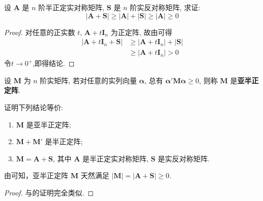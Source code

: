 \documentclass[../../main.tex]{subfiles}
\begin{document}
\begin{proposition}\label{proposition:半正定阵的行列式的相关的不等式}
设 \(\boldsymbol{A}\) 是 \(n\) 阶半正定实对称矩阵, \(\boldsymbol{S}\) 是 \(n\) 阶实反对称矩阵, 求证:
\[|\boldsymbol{A}+\boldsymbol{S}|\geq|\boldsymbol{A}|+|\boldsymbol{S}|\geq|\boldsymbol{A}|\geq0\]
\end{proposition}
\begin{proof}
对任意的正实数 \(t\), \(\boldsymbol{A}+t\boldsymbol{I}_n\) 为正定阵, 故由可得
\begin{align*}
|\boldsymbol{A}+t\boldsymbol{I}_n+\boldsymbol{S}|&\geq|\boldsymbol{A}+t\boldsymbol{I}_n|+|\boldsymbol{S}|\\
&\geq|\boldsymbol{A}+t\boldsymbol{I}_n|>0
\end{align*}
令\(t\to0^+\),即得结论.
\end{proof}

\begin{definition}[亚半正定]
设 \(\boldsymbol{M}\) 为 \(n\) 阶实矩阵, 若对任意的实列向量 \(\boldsymbol{\alpha}\), 总有 \(\boldsymbol{\alpha}'\boldsymbol{M}\boldsymbol{\alpha}\geq0\), 则称 \(\boldsymbol{M}\) 是\textbf{亚半正定阵}. 
\end{definition}

\begin{theorem}\label{theorem:亚半正定阵的等价条件}
证明下列结论等价:
\begin{enumerate}[(1)]
\item \(\boldsymbol{M}\) 是亚半正定阵;
\item \(\boldsymbol{M}+\boldsymbol{M}'\) 是半正定阵;
\item \(\boldsymbol{M}=\boldsymbol{A}+\boldsymbol{S}\), 其中 \(\boldsymbol{A}\) 是半正定实对称矩阵, \(\boldsymbol{S}\) 是实反对称矩阵.
\end{enumerate} 
\end{theorem}
\begin{remark}
由可知，亚半正定阵 \(\boldsymbol{M}\) 天然满足 \(|\boldsymbol{M}| = |\boldsymbol{A}+\boldsymbol{S}|\geq0\).
\end{remark}
\begin{proof}
与的证明完全类似.
\end{proof}
\end{document}
